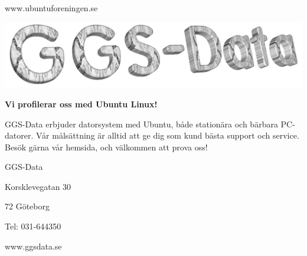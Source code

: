 \documentclass[a4paper,final]{memoir} %
\begin{document}
{\Large

\noindent www.ubuntuforeningen.se

}

\vspace*{0pt plus 4fill}

\newpage


\xannons 

\vspace*{0pt plus 2fill}

\begin{center}

\noindent\includegraphics[width=.75\textwidth]{bilder804-all/ggs1024}

\end{center}

\vspace*{0pt plus 1fill}

\noindent\textbf{\huge Vi profilerar oss med Ubuntu Linux!}

\vspace*{.75\baselineskip}

\noindent GGS-Data erbjuder datorsystem med Ubuntu, både stationära och bärbara PC-datorer. Vår målsättning är alltid att ge dig som kund bästa support och service. Besök gärna vår hemsida, och välkommen att prova oss!

\vspace*{.75\baselineskip}

\noindent GGS-Data

\noindent Korsklevegatan 30

 72 Göteborg

\noindent Tel: 031-644350

\vspace*{.75\baselineskip}

{\Large

\noindent www.ggsdata.se

}
\vspace*{0pt plus 4fill}

\newpage

\xannons 

\RaggedRight
\raggedbottom

\renewcommand{\itemhook}{%
  \setlength{\topsep}{.75\baselineskip plus 0pt minus .25\baselineskip}%
  \setlength{\partopsep}{0pt plus 0pt minus 0pt}%
  \setlength{\itemsep}{0pt plus 0pt minus 0pt}%
  \setlength{\parsep}{0pt}
}
\end{document}
